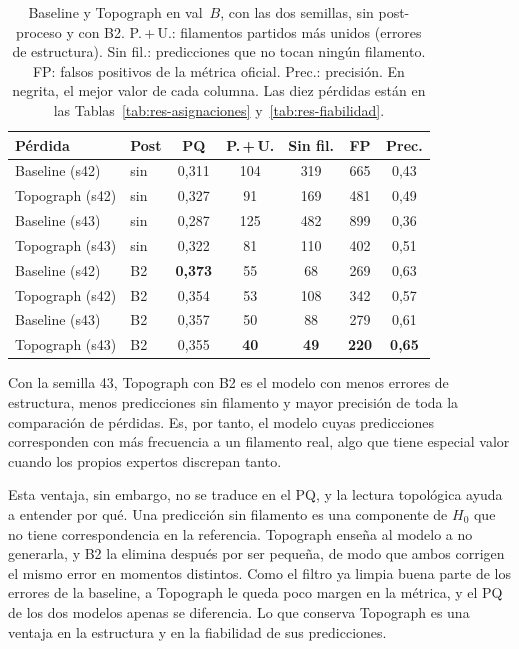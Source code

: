\begin{table}[ht]
\centering
\small
\begin{tabular}{@{}llccccc@{}}
\toprule
Pérdida & Post & PQ & P.\,+\,U. & Sin fil. & FP & Prec.\\
\midrule
Baseline (s42)  & sin & 0,311 & 104 & 319 & 665 & 0,43\\
Topograph (s42) & sin & 0,327 & 91  & 169 & 481 & 0,49\\
Baseline (s43)  & sin & 0,287 & 125 & 482 & 899 & 0,36\\
Topograph (s43) & sin & 0,322 & 81  & 110 & 402 & 0,51\\
\midrule
Baseline (s42)  & B2 & \textbf{0,373} & 55 & 68  & 269 & 0,63\\
Topograph (s42) & B2 & 0,354 & 53 & 108 & 342 & 0,57\\
Baseline (s43)  & B2 & 0,357 & 50 & 88  & 279 & 0,61\\
Topograph (s43) & B2 & 0,355 & \textbf{40} & \textbf{49} & \textbf{220} & \textbf{0,65}\\
\bottomrule
\end{tabular}
\caption{Baseline y Topograph en val~$B$, con las dos semillas, sin
post-proceso y con B2. P.\,+\,U.: filamentos partidos más unidos
(errores de estructura). Sin fil.: predicciones que no tocan ningún
filamento. FP: falsos positivos de la métrica oficial. Prec.:
precisión. En negrita, el mejor valor de cada columna. Las diez pérdidas
están en las Tablas~\ref{tab:res-asignaciones}
y~\ref{tab:res-fiabilidad}.}
\label{tab:res-topo}
\end{table}

Con la semilla 43, Topograph con B2 es el modelo con menos errores de
estructura, menos predicciones sin filamento y mayor precisión de toda
la comparación de pérdidas. Es, por tanto, el modelo cuyas predicciones
corresponden con más frecuencia a un filamento real, algo que tiene
especial valor cuando los propios expertos discrepan tanto.

Esta ventaja, sin embargo, no se traduce en el PQ, y la lectura
topológica ayuda a entender por qué. Una predicción sin filamento es una
componente de $H_0$ que no tiene correspondencia en la referencia.
Topograph enseña al modelo a no generarla, y B2 la elimina después por
ser pequeña, de modo que ambos corrigen el mismo error en momentos
distintos. Como el filtro ya limpia buena parte de los errores de la
baseline, a Topograph le queda poco margen en la métrica, y el PQ de los
dos modelos apenas se diferencia. Lo que conserva Topograph es una
ventaja en la estructura y en la fiabilidad de sus predicciones.

